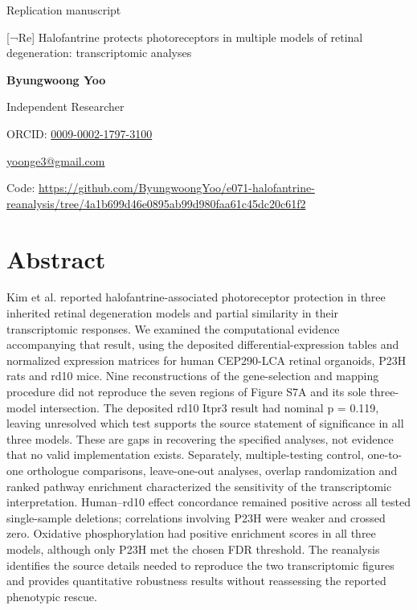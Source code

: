 \documentclass[a4paper,10pt]{article}
\begin{document}
{\sffamily\small Replication manuscript\par}
\vspace{6pt}

{\LARGE\sffamily\bfseries\raggedright{} [¬Re] Halofantrine protects photoreceptors in multiple models of retinal degeneration: transcriptomic analyses\par}
\vspace{8pt}
{\sffamily\bfseries Byungwoong Yoo\par}
{\small\sffamily Independent Researcher\par}
{\small\sffamily ORCID: \href{https://orcid.org/0009-0002-1797-3100}{0009-0002-1797-3100}\par}
{\small\sffamily\href{mailto:yoonge3@gmail.com}{yoonge3@gmail.com}\par}
\vspace{8pt}
{\small\sffamily Code: \url{https://github.com/ByungwoongYoo/e071-halofantrine-reanalysis/tree/4a1b699d46e0895ab99d980faa61c45dc20c61f2}\par}
\section*{Abstract}
Kim et al. reported halofantrine-associated photoreceptor protection in three inherited retinal degeneration models and partial similarity in their transcriptomic responses. We examined the computational evidence accompanying that result, using the deposited differential-expression tables and normalized expression matrices for human CEP290-LCA retinal organoids, P23H rats and rd10 mice. Nine reconstructions of the gene-selection and mapping procedure did not reproduce the seven regions of Figure S7A and its sole three-model intersection. The deposited rd10 Itpr3 result had nominal p = 0.119, leaving unresolved which test supports the source statement of significance in all three models. These are gaps in recovering the specified analyses, not evidence that no valid implementation exists. Separately, multiple-testing control, one-to-one orthologue comparisons, leave-one-out analyses, overlap randomization and ranked pathway enrichment characterized the sensitivity of the transcriptomic interpretation. Human–rd10 effect concordance remained positive across all tested single-sample deletions; correlations involving P23H were weaker and crossed zero. Oxidative phosphorylation had positive enrichment scores in all three models, although only P23H met the chosen FDR threshold. The reanalysis identifies the source details needed to reproduce the two transcriptomic figures and provides quantitative robustness results without reassessing the reported phenotypic rescue.
\end{document}
